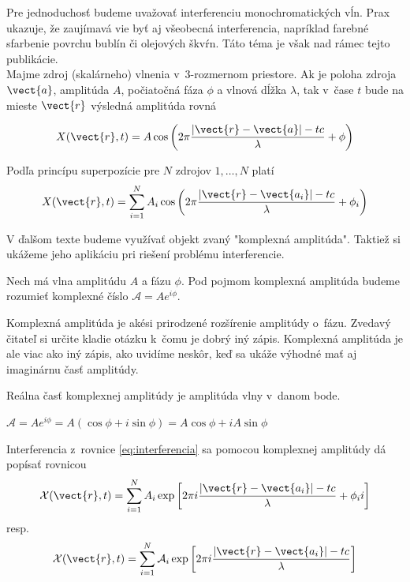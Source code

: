 Pre jednoduchosť budeme uvažovať interferenciu monochromatických vĺn.
Prax ukazuje, že zaujímavá vie byť aj všeobecná interferencia,
napríklad farebné sfarbenie povrchu bublín či olejových škvŕn. 
Táto téma je však nad rámec tejto publikácie.
\\

Majme zdroj (skalárneho) vlnenia v~3-rozmernom priestore.
Ak je poloha zdroja $\vect{a}$, amplitúda $A$, počiatočná fáza $\phi$ a vlnová dĺžka
$\lambda$, tak v~čase $t$ bude na mieste $\vect{r}$ výsledná amplitúda rovná

\begin{equation}
X(\vect{r},t)=A \cos \left(2 \pi \frac{|\vect{r}-\vect{a}| - t
c}{\lambda}+\phi \right)
\end{equation}

Podľa princípu superpozície pre $N$ zdrojov $1,\dots,N$ platí
\begin{equation}
X(\vect{r},t)=\sum_{i=1}^{N} A_i \cos \left(2 \pi
\frac{|\vect{r}-\vect{a_i}| - t c}{\lambda}+\phi_i \right)
\label{eq:interferencia}
\end{equation}

V ďalšom texte budeme využívať objekt zvaný "komplexná amplitúda".
Taktiež si ukážeme jeho aplikáciu pri riešení problému interferencie.

\begin{definicia}
Nech má vlna amplitúdu $A$ a fázu $\phi$.
Pod pojmom komplexná amplitúda budeme rozumieť komplexné číslo
$\mathcal{A}=A e^{i \phi}$.
\end{definicia}

\begin{poznamka}
 Komplexná amplitúda je akési prirodzené rozšírenie amplitúdy 
 o~fázu. Zvedavý čitateľ si určite kladie otázku k~čomu je dobrý iný
 zápis. Komplexná amplitúda je ale viac ako iný zápis, ako uvidíme
 neskôr, keď sa ukáže výhodné mať aj imaginárnu časť amplitúdy.
\end{poznamka}


\begin{lema}
Reálna časť komplexnej amplitúdy je amplitúda vlny v~danom bode.
\end{lema}
\begin{dokaz}
$\mathcal{A}=A e^{i \phi} = A (\cos \phi + i \sin \phi) =
A \cos \phi + i A \sin \phi$
\end{dokaz}

\begin{lema}
Interferencia z~rovnice \ref{eq:interferencia} sa pomocou
komplexnej amplitúdy dá popísať rovnicou
\begin{equation}
\mathcal{X}(\vect{r},t)=\sum_{i=1}^{N} 
A_i 
\exp \left[2 \pi i
\frac{|\vect{r}-\vect{a_i}| - t c}{\lambda}+ \phi_i i \right]
\end{equation}
resp.
\begin{equation}
\mathcal{X}(\vect{r},t)=\sum_{i=1}^{N} 
\mathcal{A}_i \exp \left[2 \pi i \frac{|\vect{r}-\vect{a_i}|
-tc}{\lambda}  \right]
\end{equation} 
\end{lema}

